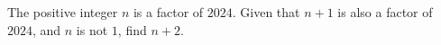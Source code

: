 The positive integer $n$ is a factor of $2024$. Given that $n + 1$ is also a factor of $2024$, and $n$ is not $1$, find $n + 2$.
